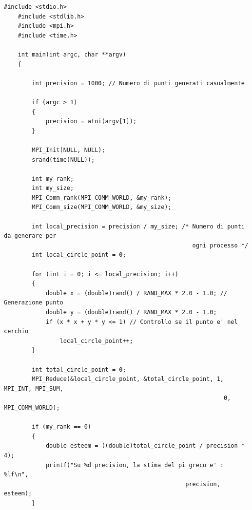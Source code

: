 \documentclass[10pt, letterpaper]{report}
\begin{document}
\begin{lstlisting}[style=CStyle]
    #include <stdio.h>
    #include <stdlib.h>
    #include <mpi.h>
    #include <time.h>
    
    int main(int argc, char **argv)
    {
    
        int precision = 1000; // Numero di punti generati casualmente
    
        if (argc > 1)
        {
            precision = atoi(argv[1]);
        }
    
        MPI_Init(NULL, NULL);
        srand(time(NULL));
    
        int my_rank;
        int my_size;
        MPI_Comm_rank(MPI_COMM_WORLD, &my_rank);
        MPI_Comm_size(MPI_COMM_WORLD, &my_size);
    
        int local_precision = precision / my_size; /* Numero di punti da generare per
                                                      ogni processo */
        int local_circle_point = 0;
    
        for (int i = 0; i <= local_precision; i++)
        {
            double x = (double)rand() / RAND_MAX * 2.0 - 1.0; // Generazione punto
            double y = (double)rand() / RAND_MAX * 2.0 - 1.0;
            if (x * x + y * y <= 1) // Controllo se il punto e' nel cerchio
                local_circle_point++;
        }
    
        int total_circle_point = 0;
        MPI_Reduce(&local_circle_point, &total_circle_point, 1, MPI_INT, MPI_SUM,
                                                               0, MPI_COMM_WORLD);
    
        if (my_rank == 0)
        {
            double esteem = ((double)total_circle_point / precision * 4);
            printf("Su %d precision, la stima del pi greco e' : %lf\n",
                                                    precision, esteem);
        }
    

\end{lstlisting}
\end{document}
